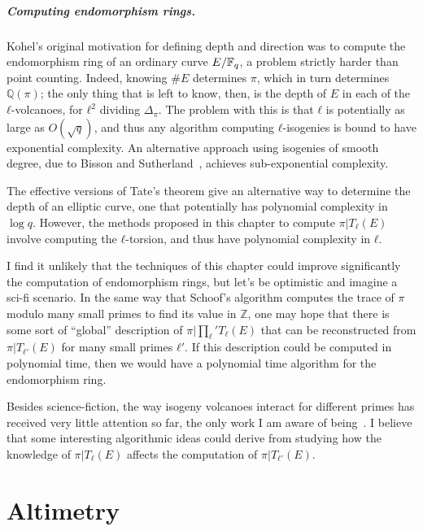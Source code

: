 \documentclass[b5layout]{hdr}
\begin{document}
\paragraph{Computing endomorphism rings.}
Kohel's original motivation for defining depth and direction was to
compute the endomorphism ring of an ordinary curve $E/\mathbb{F}_q$, a problem
strictly harder than point counting. %
Indeed, knowing $\#E$ determines $π$, which in turn determines $ℚ(π)$;
the only thing that is left to know, then, is the depth of $E$ in each
of the $ℓ$-volcanoes, for $ℓ^2$ dividing $Δ_π$. %
The problem with this is that $ℓ$ is potentially as large as
$O(\sqrt{q})$, and thus any algorithm computing $ℓ$-isogenies is bound
to have exponential complexity. %
An alternative approach using isogenies of smooth degree, due to
Bisson and Sutherland~\cite{bisson+sutherland11}, achieves
sub-exponential complexity. %

The effective versions of Tate's theorem give an alternative way to
determine the depth of an elliptic curve, one that potentially has
polynomial complexity in $\log q$. %
However, the methods proposed in this chapter to compute $π|T_ℓ(E)$
involve computing the $ℓ$-torsion, and thus have polynomial complexity
in $ℓ$. %

I find it unlikely that the techniques of this chapter could improve
significantly the computation of endomorphism rings, but let's be
optimistic and imagine a sci-fi scenario. %
In the same way that Schoof's algorithm computes the trace of $π$
modulo many small primes to find its value in $ℤ$, one may hope that
there is some sort of ``global'' description of $π|\prod_ℓ'T_ℓ(E)$ that
can be reconstructed from $π|T_{ℓ'}(E)$ for many small primes $ℓ'$. %
If this description could be computed in polynomial time, then we
would have a polynomial time algorithm for the endomorphism ring. %

Besides science-fiction, the way isogeny volcanoes interact for
different primes has received very little attention so far, the only
work I am aware of being~\cite{MOODY20125249}. %
I believe that some interesting algorithmic ideas could derive from
studying how the knowledge of $π|T_ℓ(E)$ affects the computation of
$π|T_{ℓ'}(E)$.




\chapter{Altimetry}
\label{cha:fpbar}
\end{document}
